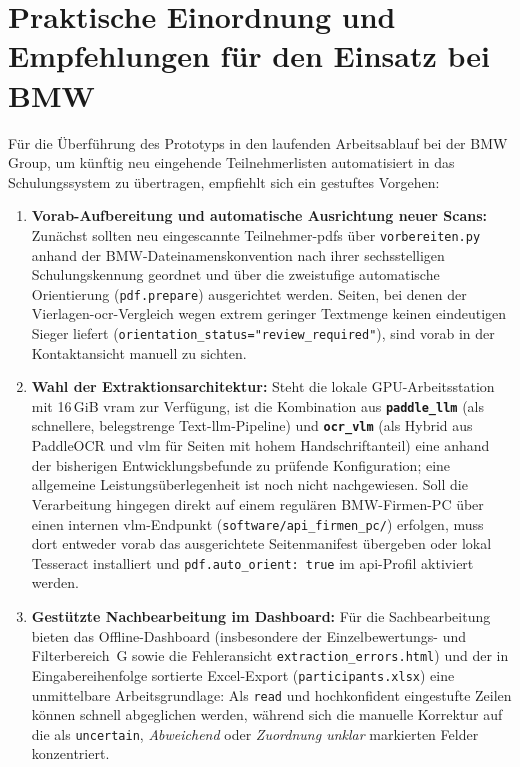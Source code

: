 \section{Praktische Einordnung und Empfehlungen für den Einsatz bei BMW}
\label{sec:diskussion-praxis}

Für die Überführung des Prototyps in den laufenden Arbeitsablauf bei der BMW Group, um künftig neu eingehende Teilnehmerlisten automatisiert in das Schulungssystem zu übertragen, empfiehlt sich ein gestuftes Vorgehen:
\begin{enumerate}
  \item \textbf{Vorab-Aufbereitung und automatische Ausrichtung neuer Scans:} Zunächst sollten neu eingescannte Teilnehmer-\acp{pdf} über \texttt{vorbereiten.py} anhand der BMW-Dateinamenskonvention nach ihrer sechsstelligen Schulungskennung geordnet und über die zweistufige automatische Orientierung (\texttt{pdf.prepare}) ausgerichtet werden. Seiten, bei denen der Vierlagen-\ac{ocr}-Vergleich wegen extrem geringer Textmenge keinen eindeutigen Sieger liefert (\texttt{orientation\_status="review\_required"}), sind vorab in der Kontaktansicht manuell zu sichten.
  \item \textbf{Wahl der Extraktionsarchitektur:} Steht die lokale GPU-Arbeitsstation mit \mbox{16\,GiB} \ac{vram} zur Verfügung, ist die Kombination aus \textbf{\texttt{paddle\_llm}} (als schnellere, belegstrenge Text-\ac{llm}-Pipeline) und \textbf{\texttt{ocr\_vlm}} (als Hybrid aus PaddleOCR und \ac{vlm} für Seiten mit hohem Handschriftanteil) eine anhand der bisherigen Entwicklungsbefunde zu pr\"ufende Konfiguration; eine allgemeine Leistungs\"uberlegenheit ist noch nicht nachgewiesen. Soll die Verarbeitung hingegen direkt auf einem regulären BMW-Firmen-PC über einen internen \ac{vlm}-Endpunkt (\texttt{software/api\_firmen\_pc/}) erfolgen, muss dort entweder vorab das ausgerichtete Seitenmanifest übergeben oder lokal Tesseract installiert und \texttt{pdf.auto\_orient: true} im \ac{api}-Profil aktiviert werden.
  \item \textbf{Gestützte Nachbearbeitung im Dashboard:} Für die Sachbearbeitung bieten das Offline-Dashboard (insbesondere der Einzelbewertungs- und Filterbereich~G sowie die Fehleransicht \texttt{extraction\_errors.html}) und der in Eingabereihenfolge sortierte Excel-Export (\texttt{participants.xlsx}) eine unmittelbare Arbeitsgrundlage: Als \texttt{read} und hochkonfident eingestufte Zeilen können schnell abgeglichen werden, während sich die manuelle Korrektur auf die als \texttt{uncertain}, \emph{Abweichend} oder \emph{Zuordnung unklar} markierten Felder konzentriert.
\end{enumerate}

